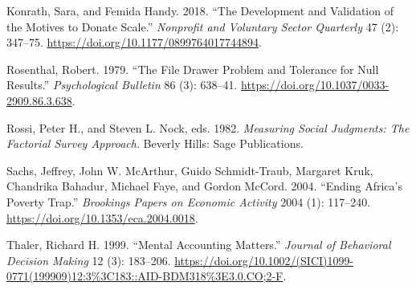 \documentclass[
  12pt,
]{article}
\begin{document}
\leavevmode\hypertarget{ref-konrathDevelopmentValidationMotives2018}{}%
Konrath, Sara, and Femida Handy. 2018. ``The Development and Validation
of the Motives to Donate Scale.'' \emph{Nonprofit and Voluntary Sector
Quarterly} 47 (2): 347--75.
\url{https://doi.org/10.1177/0899764017744894}.

\leavevmode\hypertarget{ref-rosenthalFileDrawerProblem1979}{}%
Rosenthal, Robert. 1979. ``The File Drawer Problem and Tolerance for
Null Results.'' \emph{Psychological Bulletin} 86 (3): 638--41.
\url{https://doi.org/10.1037/0033-2909.86.3.638}.

\leavevmode\hypertarget{ref-rossiMeasuringSocialJudgments1982}{}%
Rossi, Peter H., and Steven L. Nock, eds. 1982. \emph{Measuring Social
Judgments: The Factorial Survey Approach}. Beverly Hills: Sage
Publications.

\leavevmode\hypertarget{ref-sachsEndingAfricaPoverty2004}{}%
Sachs, Jeffrey, John W. McArthur, Guido Schmidt-Traub, Margaret Kruk,
Chandrika Bahadur, Michael Faye, and Gordon McCord. 2004. ``Ending
Africa's Poverty Trap.'' \emph{Brookings Papers on Economic Activity}
2004 (1): 117--240. \url{https://doi.org/10.1353/eca.2004.0018}.

\leavevmode\hypertarget{ref-thalerMentalAccountingMatters1999}{}%
Thaler, Richard H. 1999. ``Mental Accounting Matters.'' \emph{Journal of
Behavioral Decision Making} 12 (3): 183--206.
\url{https://doi.org/10.1002/(SICI)1099-0771(199909)12:3\%3C183::AID-BDM318\%3E3.0.CO;2-F}.
\end{document}
